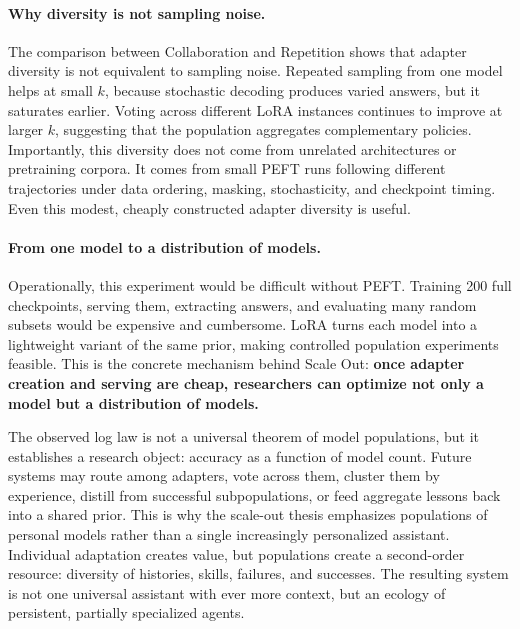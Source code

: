 
\paragraph{Why diversity is not sampling noise.}

The comparison between Collaboration and Repetition shows that adapter diversity is not equivalent to sampling noise. Repeated sampling from one model helps at small \(k\), because stochastic decoding produces varied answers, but it saturates earlier. Voting across different LoRA instances continues to improve at larger \(k\), suggesting that the population aggregates complementary policies. Importantly, this diversity does not come from unrelated architectures or pretraining corpora. It comes from small PEFT runs following different trajectories under data ordering, masking, stochasticity, and checkpoint timing. Even this modest, cheaply constructed adapter diversity is useful.

\paragraph{From one model to a distribution of models.}
Operationally, this experiment would be difficult without PEFT. Training 200 full checkpoints, serving them, extracting answers, and evaluating many random subsets would be expensive and cumbersome. LoRA turns each model into a lightweight variant of the same prior, making controlled population experiments feasible. This is the concrete mechanism behind Scale Out: \textbf{once adapter creation and serving are cheap, researchers can optimize not only a model but a distribution of models.}

The observed log law is not a universal theorem of model populations, but it establishes a research object: accuracy as a function of model count. Future systems may route among adapters, vote across them, cluster them by experience, distill from successful subpopulations, or feed aggregate lessons back into a shared prior. This is why the scale-out thesis emphasizes populations of personal models rather than a single increasingly personalized assistant. Individual adaptation creates value, but populations create a second-order resource: diversity of histories, skills, failures, and successes. The resulting system is not one universal assistant with ever more context, but an ecology of persistent, partially specialized agents.
